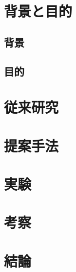 \documentclass[twocolumn]{jsarticle}
\begin{document}
\mtitle

\section{背景と目的}
\subsection{背景}

\subsection{目的}

\section{従来研究}
\section{提案手法}
\section{実験}
\section{考察}
\section{結論}

\end{document}
